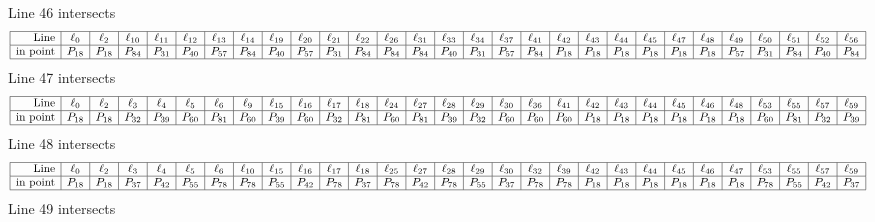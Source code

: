 \documentclass{article}
\begin{document}
{$$$$
Line 46 intersects 
$$
\begin{array}{|r*{28}{|c}|}
\hline
\mbox{Line}  & \ell_{0} & \ell_{2} & \ell_{10} & \ell_{11} & \ell_{12} & \ell_{13} & \ell_{14} & \ell_{19} & \ell_{20} & \ell_{21} & \ell_{22} & \ell_{26} & \ell_{31} & \ell_{33} & \ell_{34} & \ell_{37} & \ell_{41} & \ell_{42} & \ell_{43} & \ell_{44} & \ell_{45} & \ell_{47} & \ell_{48} & \ell_{49} & \ell_{50} & \ell_{51} & \ell_{52} & \ell_{56}\\
\hline
\mbox{in point}  & P_{18} & P_{18} & P_{84} & P_{31} & P_{40} & P_{57} & P_{84} & P_{40} & P_{57} & P_{31} & P_{84} & P_{84} & P_{84} & P_{40} & P_{31} & P_{57} & P_{84} & P_{18} & P_{18} & P_{18} & P_{18} & P_{18} & P_{18} & P_{57} & P_{31} & P_{84} & P_{40} & P_{84}\\
\hline
\end{array}
$$
Line 47 intersects 
$$
\begin{array}{|r*{28}{|c}|}
\hline
\mbox{Line}  & \ell_{0} & \ell_{2} & \ell_{3} & \ell_{4} & \ell_{5} & \ell_{6} & \ell_{9} & \ell_{15} & \ell_{16} & \ell_{17} & \ell_{18} & \ell_{24} & \ell_{27} & \ell_{28} & \ell_{29} & \ell_{30} & \ell_{36} & \ell_{41} & \ell_{42} & \ell_{43} & \ell_{44} & \ell_{45} & \ell_{46} & \ell_{48} & \ell_{53} & \ell_{55} & \ell_{57} & \ell_{59}\\
\hline
\mbox{in point}  & P_{18} & P_{18} & P_{32} & P_{39} & P_{60} & P_{81} & P_{60} & P_{39} & P_{60} & P_{32} & P_{81} & P_{60} & P_{81} & P_{39} & P_{32} & P_{60} & P_{60} & P_{60} & P_{18} & P_{18} & P_{18} & P_{18} & P_{18} & P_{18} & P_{60} & P_{81} & P_{32} & P_{39}\\
\hline
\end{array}
$$
Line 48 intersects 
$$
\begin{array}{|r*{28}{|c}|}
\hline
\mbox{Line}  & \ell_{0} & \ell_{2} & \ell_{3} & \ell_{4} & \ell_{5} & \ell_{6} & \ell_{10} & \ell_{15} & \ell_{16} & \ell_{17} & \ell_{18} & \ell_{25} & \ell_{27} & \ell_{28} & \ell_{29} & \ell_{30} & \ell_{32} & \ell_{39} & \ell_{42} & \ell_{43} & \ell_{44} & \ell_{45} & \ell_{46} & \ell_{47} & \ell_{53} & \ell_{55} & \ell_{57} & \ell_{59}\\
\hline
\mbox{in point}  & P_{18} & P_{18} & P_{37} & P_{42} & P_{55} & P_{78} & P_{78} & P_{55} & P_{42} & P_{78} & P_{37} & P_{78} & P_{42} & P_{78} & P_{55} & P_{37} & P_{78} & P_{78} & P_{18} & P_{18} & P_{18} & P_{18} & P_{18} & P_{18} & P_{78} & P_{55} & P_{42} & P_{37}\\
\hline
\end{array}
$$
Line 49 intersects 
}
\end{document}
